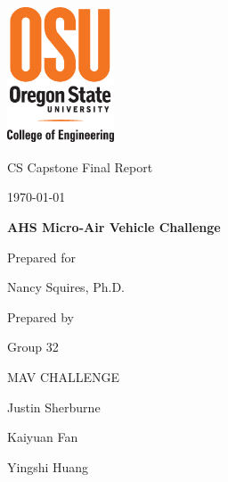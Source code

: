 \documentclass[onecolumn, draftclsnofoot,10pt, compsoc]{IEEEtran}
\def \CapstoneTeamName{		MAV CHALLENGE}
\def \CapstoneTeamNumber{		32}
\def \GroupMemberOne{			Justin Sherburne}
\def \GroupMemberTwo{			Kaiyuan Fan}
\def \GroupMemberThree{			Yingshi Huang}
\def \CapstoneProjectName{		AHS Micro-Air Vehicle Challenge}
\def \CapstoneSponsorPerson{		Nancy Squires, Ph.D.}
\def \DocType{		%
				Final Report
				}
\newcommand{\NameSigPair}[1]{\par
\makebox[2.75in][r]{#1} \hfil 	\makebox[3.25in]{\makebox[2.25in]{\hrulefill} \hfill		\makebox[.75in]{\hrulefill}}
\par\vspace{-12pt} \textit{\tiny\noindent
\makebox[2.75in]{} \hfil		\makebox[3.25in]{\makebox[2.25in][r]{Signature} \hfill	\makebox[.75in][r]{Date}}}}
\renewcommand{\NameSigPair}[1]{#1}
\begin{document}
\begin{titlepage}
    \begin{singlespace}
    	\includegraphics[height=4cm]{coe_v_spot1}
        \hfill 
        \par\vspace{.2in}
        \centering
        \scshape{
            \huge CS Capstone \DocType \par
            {\large\today}\par
            \vspace{8pt}
            \textbf{\Huge\CapstoneProjectName}\par
			\vspace{1.5in}
            {\large Prepared for}\par
            {\Large\NameSigPair{\CapstoneSponsorPerson}\par}
			\vspace{3pt}
            {\large Prepared by }\par
            Group\CapstoneTeamNumber\par
            \CapstoneTeamName\par 
            \vspace{8pt}
            {\Large
                \NameSigPair{\GroupMemberOne}\par
                \NameSigPair{\GroupMemberTwo}\par
                \NameSigPair{\GroupMemberThree}\par
            }
            \vspace{.5in}
        }
        \begin{abstract}
        The purpose of this document is to compile all documentation from this project into a single source. This is a culmination of the work contributed by the computer science team for the Micro Air-Vehicle challenge project. We will provide in-depth summaries regarding weekly activities, research, and design attributes for this project. Design choices, key project components, and installation instructions will also be covered in this report.
        
        \end{abstract}     
    \end{singlespace}
\end{titlepage}
\newpage
{}
\tableofcontents
\listoffigures
\clearpage
\end{document}

